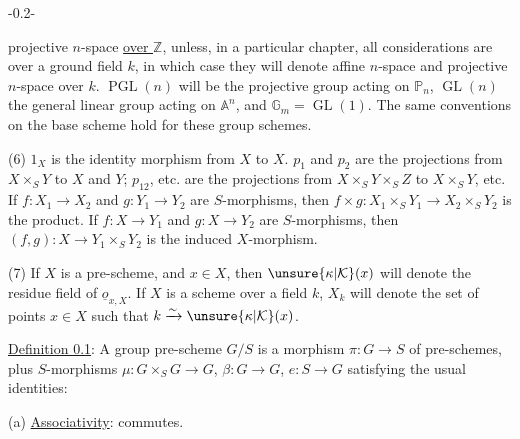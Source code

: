 

\begin{center}-0.2-\end{center}

projective $n$-space \uline{over $\mathbb Z$}, unless, in a particular chapter, all considerations are over a ground field $k$, in which case they will denote affine $n$-space and projective $n$-space over $k$. $\operatorname{PGL}(n)$ will be the projective group acting on $\mathbb P_n$, $\operatorname{GL}(n)$ the general linear group acting on $\mathbb A^n$, and $\mathbb G_m=\operatorname{GL}(1)$. The same conventions on the base scheme hold for these group schemes.

(6) $1_X$ is the identity morphism from $X$ to $X$. $p_1$ and $p_2$ are the projections from $X\times_S Y$ to $X$ and $Y$; $p_{12}$, etc. are the projections from $X\times_S Y\times_S Z$ to $X\times_S Y$, etc. If $f:X_1\longrightarrow X_2$ and $g:Y_1\longrightarrow Y_2$ are $S$-morphisms, then $f\times g:X_1\times_S Y_1\longrightarrow X_2\times_S Y_2$ is the product. If $f:X\longrightarrow Y_1$ and $g:X\longrightarrow Y_2$ are $S$-morphisms, then $(f,g):X\longrightarrow Y_1\times_S Y_2$ is the induced $X$-morphism.

(7) If $X$ is a pre-scheme, and $x\in X$, then $\unsure{\kappa|\mathcal K}(x)$ will denote the residue field of $\underline o_{x,X}$. If $X$ is a scheme over a field $k$, $X_k$ will denote the set of points $x\in X$ such that $k\xrightarrow{\sim}\unsure{\kappa|\mathcal K}(x)$.


 \uline{Definition 0.1}: A group pre-scheme $G/S$ is a morphism $\pi:G\longrightarrow S$ of pre-schemes, plus $S$-morphisms $\mu:G\times_S G\longrightarrow G$, $\beta:G\longrightarrow G$, $e:S\longrightarrow G$ satisfying the usual identities:

(a) \uline{Associativity}:
 commutes.

